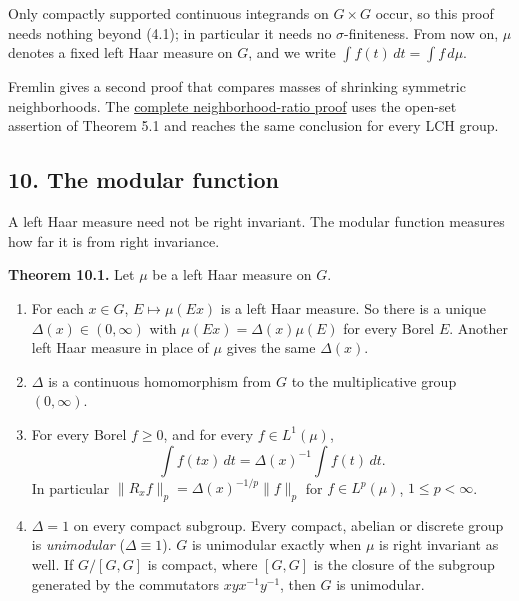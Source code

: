 \documentclass[
  english,
  11pt,
  a4paper,
]{article}
\providecommand{\tightlist}{%
  \setlength{\itemsep}{0pt}\setlength{\parskip}{0pt}}
\begin{document}
Only compactly supported continuous integrands on \(G\times G\) occur,
so this proof needs nothing beyond (4.1); in particular it needs no
\(\sigma\)-finiteness. From now on, \(\mu\) denotes a fixed left Haar
measure on \(G\), and we write \(\int f(t)\,dt=\int f\,d\mu\).

Fremlin gives a second proof that compares masses of shrinking symmetric
neighborhoods. The \hyperref[fremlin-neighbourhood-uniqueness]{complete
neighborhood-ratio proof} uses the open-set assertion of Theorem 5.1 and
reaches the same conclusion for every LCH group.

\subsection[10. The modular
function]{\texorpdfstring{\protect\hypertarget{haar-measure-on-locally-compact-groups--oa-fnd-hm-07}{}{}10.
The modular
function}{10. The modular function}}\label{haar-measure-on-locally-compact-groups--OA-FND-HM-07}

A left Haar measure need not be right invariant. The modular function
measures how far it is from right invariance.

\textbf{Theorem 10.1.} Let \(\mu\) be a left Haar measure on \(G\).

\begin{enumerate}
\tightlist
\item
  For each \(x\in G\), \(E\mapsto\mu(Ex)\) is a left Haar measure. So
  there is a unique \(\Delta(x)\in(0,\infty)\) with
  \(\mu(Ex)=\Delta(x)\mu(E)\) for every Borel \(E\). Another left Haar
  measure in place of \(\mu\) gives the same \(\Delta(x)\).
\item
  \(\Delta\) is a continuous homomorphism from \(G\) to the
  multiplicative group \((0,\infty)\).
\item
  For every Borel \(f\geq0\), and for every \(f\in L^1(\mu)\),
  \[\int f(tx)\,dt=\Delta(x)^{-1}\int f(t)\,dt .
  \tag{10.1}\] In particular \(\|R_xf\|_p=\Delta(x)^{-1/p}\|f\|_p\) for
  \(f\in L^p(\mu)\), \(1\leq p<\infty\).
\item
  \(\Delta=1\) on every compact subgroup. Every compact, abelian or
  discrete group is \emph{unimodular} (\(\Delta\equiv1\)). \(G\) is
  unimodular exactly when \(\mu\) is right invariant as well. If
  \(G/[G,G]\) is compact, where \([G,G]\) is the closure of the subgroup
  generated by the commutators \(xyx^{-1}y^{-1}\), then \(G\) is
  unimodular.
\end{enumerate}
\end{document}
